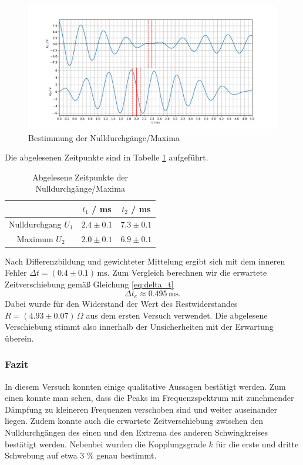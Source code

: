 \begin{figure}[H]
\centering
\includegraphics[width=\textwidth]{plots/delta_t_bsp.pdf}
\caption{Bestimmung der Nulldurchgänge/Maxima}
\label{abb:delta_t_bsp}
\end{figure}

Die abgelesenen Zeitpunkte sind in Tabelle \ref{tab:delta_t_zeiten} aufgeführt.

\begin{table}[H]
\centering
\begin{tabular}{c|c|c}
& $t_1$ / ms & $t_2$ / ms \\
\hline
Nulldurchgang $U_1$ & $2.4 \pm 0.1$ & $7.3 \pm 0.1$ \\
Maximum $U_2$ & $2.0 \pm 0.1$ & $6.9 \pm 0.1$
\end{tabular}
\caption{Abgelesene Zeitpunkte der Nulldurchgänge/Maxima}
\label{tab:delta_t_zeiten}
\end{table}

Nach Differenzbildung und gewichteter Mittelung ergibt sich mit dem inneren Fehler $\Delta t = (0.4 \pm 0.1) \, \mathrm{ms}$. Zum Vergleich berechnen wir die erwartete Zeitverschiebung gemäß Gleichung \ref{eq:delta_t}
$$\Delta t_e \approx 0.495 \, \mathrm{ms}.$$
Dabei wurde für den Widerstand der Wert des Restwiderstandes $R = (4.93 \pm 0.07)\,\Omega$ aus dem ersten Versuch verwendet. Die abgelesene Verschiebung stimmt also innerhalb der Unsicherheiten mit der Erwartung überein.

\subsubsection{Fazit}

In diesem Versuch konnten einige qualitative Aussagen bestätigt werden. Zum einen konnte man sehen, dass die Peaks im Frequenzspektrum mit zunehmender Dämpfung zu kleineren Frequenzen verschoben sind und weiter auseinander liegen. Zudem konnte auch die erwartete Zeitverschiebung zwischen den Nulldurchgängen des einen und den Extrema des anderen Schwingkreises bestätigt werden. Nebenbei wurden die Kopplungsgrade $k$ für die erste und dritte Schwebung auf etwa 3 \% genau bestimmt.




